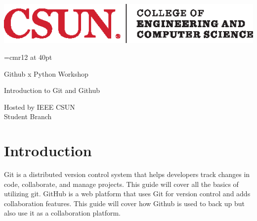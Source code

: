 \documentclass[12pt, a4paper]{article}
\begin{document}
\thispagestyle{empty}

\includegraphics[scale=2]{./images/ECS.eps}

\vspace{2in}
\font\tmpfont=cmr12 at 40pt  %
{\centering\tmpfont Github x Python Workshop \par}

\vskip30pt

\doublespacing
{\centering\Huge Introduction to Git and Github \par}

\vspace{3in}

\begin{flushright}	
	{\Large Hosted by IEEE CSUN\\
	Student Branch}
\end{flushright}
\singlespacing
\newpage

\doublespacing %
\tableofcontents
{}
\singlespacing %
\newpage

\setlength{\headheight}{40pt}
\pagestyle{fancy}

\newenvironment{answer}{\par\bf}{}

\section{Introduction}
Git is a distributed version control system that helps developers track changes in code, collaborate, and manage projects. This guide will cover all the basics of utilizing git. GitHub is a web platform that uses Git for version control and adds collaboration features. This guide will cover how Github is used to back up but also use it as a collaboration platform.
\end{document}
